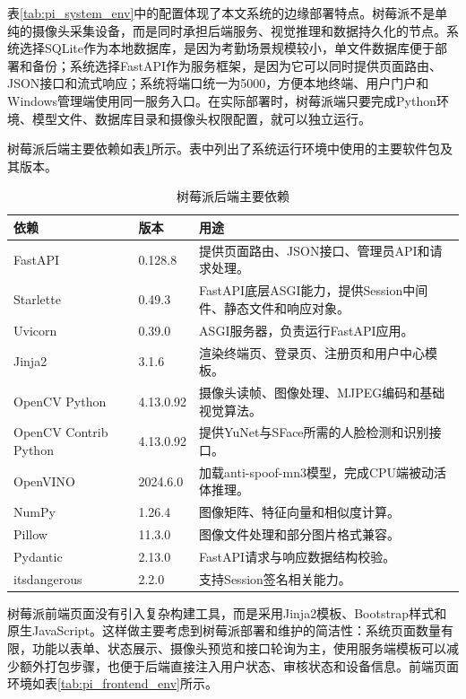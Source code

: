 表\ref{tab:pi_system_env}中的配置体现了本文系统的边缘部署特点。树莓派不是单纯的摄像头采集设备，而是同时承担后端服务、视觉推理和数据持久化的节点。系统选择SQLite作为本地数据库，是因为考勤场景规模较小，单文件数据库便于部署和备份；系统选择FastAPI作为服务框架，是因为它可以同时提供页面路由、JSON接口和流式响应；系统将端口统一为5000，方便本地终端、用户门户和Windows管理端使用同一服务入口。在实际部署时，树莓派端只要完成Python环境、模型文件、数据库目录和摄像头权限配置，就可以独立运行。

树莓派后端主要依赖如表\ref{tab:pi_backend_env}所示。表中列出了系统运行环境中使用的主要软件包及其版本。

\begin{table}[H]
    \centering
    \caption{树莓派后端主要依赖}
    \label{tab:pi_backend_env}
    \begin{tabularx}{\textwidth}{p{3.5cm}p{3cm}X}
        \toprule
        \textbf{依赖} & \textbf{版本} & \textbf{用途} \\
        \midrule
        FastAPI & 0.128.8 & 提供页面路由、JSON接口、管理员API和请求处理。 \\
        Starlette & 0.49.3 & FastAPI底层ASGI能力，提供Session中间件、静态文件和响应对象。 \\
        Uvicorn & 0.39.0 & ASGI服务器，负责运行FastAPI应用。 \\
        Jinja2 & 3.1.6 & 渲染终端页、登录页、注册页和用户中心模板。 \\
        OpenCV Python & 4.13.0.92 & 摄像头读帧、图像处理、MJPEG编码和基础视觉算法。 \\
        OpenCV Contrib Python & 4.13.0.92 & 提供YuNet与SFace所需的人脸检测和识别接口。 \\
        OpenVINO & 2024.6.0 & 加载anti-spoof-mn3模型，完成CPU端被动活体推理。 \\
        NumPy & 1.26.4 & 图像矩阵、特征向量和相似度计算。 \\
        Pillow & 11.3.0 & 图像文件处理和部分图片格式兼容。 \\
        Pydantic & 2.13.0 & FastAPI请求与响应数据结构校验。 \\
        itsdangerous & 2.2.0 & 支持Session签名相关能力。 \\
        \bottomrule
    \end{tabularx}
\end{table}

树莓派前端页面没有引入复杂构建工具，而是采用Jinja2模板、Bootstrap样式和原生JavaScript。这样做主要考虑到树莓派部署和维护的简洁性：系统页面数量有限，功能以表单、状态展示、摄像头预览和接口轮询为主，使用服务端模板可以减少额外打包步骤，也便于后端直接注入用户状态、审核状态和设备信息。前端页面环境如表\ref{tab:pi_frontend_env}所示。

